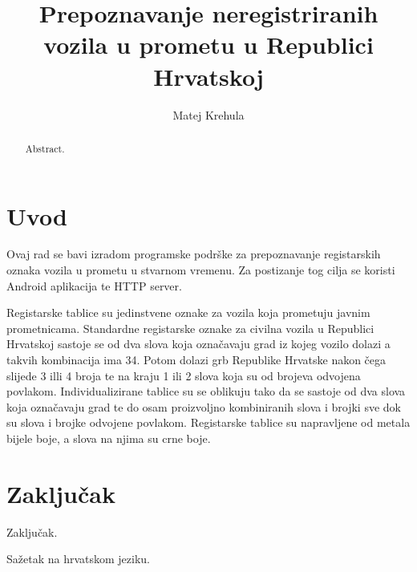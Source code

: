 \documentclass[times, utf8, zavrsni]{fer}
\begin{document}

\title{Prepoznavanje neregistriranih vozila u prometu u Republici Hrvatskoj }

\author{Matej Krehula}

\maketitle

\izvornik

\zahvala{}

\tableofcontents

\chapter{Uvod}
Ovaj rad se bavi izradom programske podrške za prepoznavanje registarskih oznaka vozila u prometu u stvarnom vremenu. Za postizanje tog cilja se koristi
Android aplikacija  te HTTP server.

Registarske tablice su jedinstvene oznake za vozila koja prometuju javnim prometnicama. Standardne registarske oznake za civilna vozila u Republici Hrvatskoj sastoje se od dva slova koja označavaju grad iz kojeg vozilo dolazi a takvih kombinacija ima 34. Potom dolazi grb  Republike Hrvatske nakon čega slijede 3 illi 4 broja te na kraju 1 ili 2 slova koja su od brojeva odvojena povlakom. Individualizirane tablice su  se oblikuju tako da se sastoje od dva slova koja označavaju grad
te do osam proizvoljno kombiniranih slova i brojki sve dok su slova i brojke odvojene povlakom.  Registarske tablice su napravljene od metala bijele boje, a slova na njima su crne boje. 





\chapter{Zaključak}
Zaključak.




\begin{sazetak}
Sažetak na hrvatskom jeziku.

\end{sazetak}

\begin{abstract}
Abstract.

\end{abstract}
\end{document}
